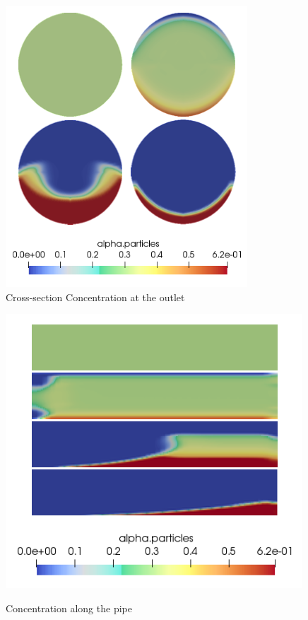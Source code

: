 \documentclass[review,3p,times,12pt]{elsarticle}
\begin{document}
\begin{minipage}{0.26\textwidth}
\begin{figure}[H]
   \begin{center}
    \includegraphics[trim=0cm 0cm 0cm 0cm,clip,scale=0.7]{7.png}
    \caption{ \footnotesize{Cross-section Concentration at the outlet} }
    \label{fig:gauss}
       \end{center}
\end{figure} 
\end{minipage}
\begin{minipage}{0.3\textwidth}
\begin{figure}[H]
   \begin{center}
    \includegraphics[trim=0cm 0cm 0cm 0cm,clip,scale=0.72]{6.png}
    {\caption{ \footnotesize Concentration along the pipe}}
    \label{fig:gauss}
       \end{center}
\end{figure} 
\end{minipage}
\end{document}
